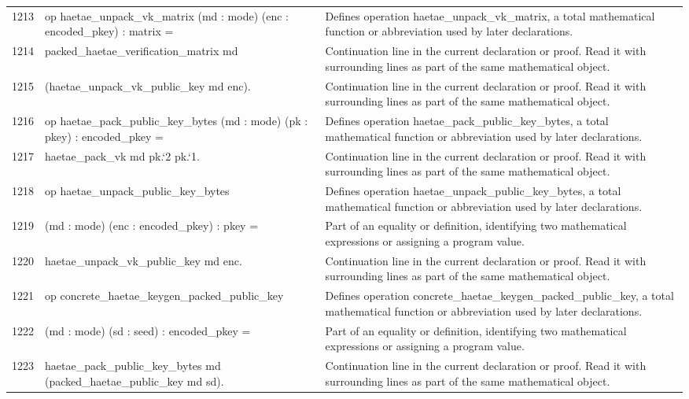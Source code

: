 \documentclass[10pt]{article}
\begin{document}
\begin{longtable}{r L{0.53\textwidth} L{0.37\textwidth}}
1213 & {\ttfamily\scriptsize op haetae\_unpack\_vk\_matrix (md : mode) (enc : encoded\_pkey) : matrix =} & Defines operation haetae\_unpack\_vk\_matrix, a total mathematical function or abbreviation used by later declarations. \\
1214 & {\ttfamily\scriptsize   packed\_haetae\_verification\_matrix md} & Continuation line in the current declaration or proof.  Read it with surrounding lines as part of the same mathematical object. \\
1215 & {\ttfamily\scriptsize     (haetae\_unpack\_vk\_public\_key md enc).} & Continuation line in the current declaration or proof.  Read it with surrounding lines as part of the same mathematical object. \\
1216 & {\ttfamily\scriptsize op haetae\_pack\_public\_key\_bytes (md : mode) (pk : pkey) : encoded\_pkey =} & Defines operation haetae\_pack\_public\_key\_bytes, a total mathematical function or abbreviation used by later declarations. \\
1217 & {\ttfamily\scriptsize   haetae\_pack\_vk md pk.`2 pk.`1.} & Continuation line in the current declaration or proof.  Read it with surrounding lines as part of the same mathematical object. \\
1218 & {\ttfamily\scriptsize op haetae\_unpack\_public\_key\_bytes} & Defines operation haetae\_unpack\_public\_key\_bytes, a total mathematical function or abbreviation used by later declarations. \\
1219 & {\ttfamily\scriptsize    (md : mode) (enc : encoded\_pkey) : pkey =} & Part of an equality or definition, identifying two mathematical expressions or assigning a program value. \\
1220 & {\ttfamily\scriptsize   haetae\_unpack\_vk\_public\_key md enc.} & Continuation line in the current declaration or proof.  Read it with surrounding lines as part of the same mathematical object. \\
1221 & {\ttfamily\scriptsize op concrete\_haetae\_keygen\_packed\_public\_key} & Defines operation concrete\_haetae\_keygen\_packed\_public\_key, a total mathematical function or abbreviation used by later declarations. \\
1222 & {\ttfamily\scriptsize    (md : mode) (sd : seed) : encoded\_pkey =} & Part of an equality or definition, identifying two mathematical expressions or assigning a program value. \\
1223 & {\ttfamily\scriptsize   haetae\_pack\_public\_key\_bytes md (packed\_haetae\_public\_key md sd).} & Continuation line in the current declaration or proof.  Read it with surrounding lines as part of the same mathematical object. \\

\end{longtable}
\end{document}
